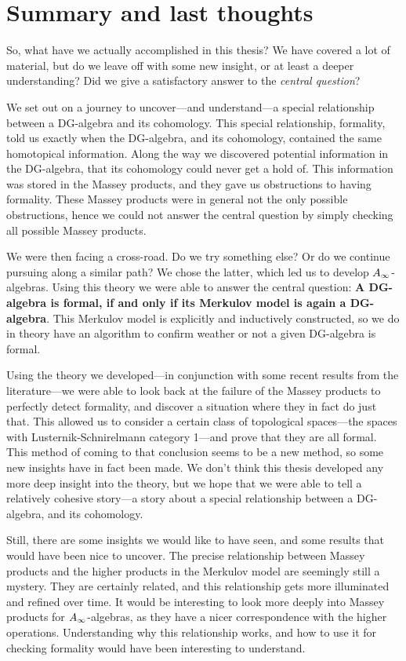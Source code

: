 \clearpage
\section{Summary and last thoughts}

So, what have we actually accomplished in this thesis? We have covered a lot of material, but do we leave off with some new insight, or at least a deeper understanding? Did we give a satisfactory answer to the \emph{central question}?

We set out on a journey to uncover---and understand---a special relationship between a DG-algebra and its cohomology. This special relationship, formality, told us exactly when the DG-algebra, and its cohomology, contained the same homotopical information. Along the way we discovered potential information in the DG-algebra, that its cohomology could never get a hold of. This information was stored in the Massey products, and they gave us obstructions to having formality. These Massey products were in general not the only possible obstructions, hence we could not answer the central question by simply checking all possible Massey products. 

We were then facing a cross-road. Do we try something else? Or do we continue pursuing along a similar path? We chose the latter, which led us to develop $A_{\infty}$-algebras. Using this theory we were able to answer the central question: \textbf{A DG-algebra is formal, if and only if its Merkulov model is again a DG-algebra}. This Merkulov model is explicitly and inductively constructed, so we do in theory have an algorithm to confirm weather or not a given DG-algebra is formal. 

Using the theory we developed---in conjunction with some recent results from the literature---we were able to look back at the failure of the Massey products to perfectly detect formality, and discover a situation where they in fact do just that. This allowed us to consider a certain class of topological spaces---the spaces with Lusternik-Schnirelmann category 1---and prove that they are all formal. This method of coming to that conclusion seems to be a new method, so some new insights have in fact been made. We don't think this thesis developed any more deep insight into the theory, but we hope that we were able to tell a relatively cohesive story---a story about a special relationship between a DG-algebra, and its cohomology. 

Still, there are some insights we would like to have seen, and some results that would have been nice to uncover. The precise relationship between Massey products and the higher products in the Merkulov model are seemingly still a mystery. They are certainly related, and this relationship gets more illuminated and refined over time. It would be interesting to look more deeply into Massey products for $A_{\infty}$-algebras, as they have a nicer correspondence with the higher operations. Understanding why this relationship works, and how to use it for checking formality would have been interesting to understand.

